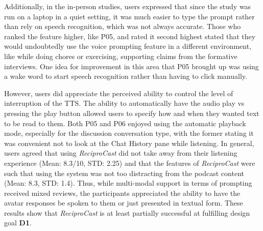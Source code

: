 \documentclass[12pt]{report}
\begin{document}
\begin{myfont}
        \indent Additionally, in the in-person studies, users expressed that since the study was run on a laptop in a quiet setting, it was much easier to type the prompt rather than rely on speech recognition, which was not always accurate. Those who ranked the feature higher, like P05, and rated it second highest stated that they would undoubtedly use the voice prompting feature in a different environment, like while doing chores or exercising, supporting claims from the formative interviews. One idea for improvement in this area that P05 brought up was using a wake word to start speech recognition rather than having to click manually.
        
        \indent However, users did appreciate the perceived ability to control the level of interruption of the TTS. The ability to automatically have the audio play vs pressing the play button allowed users to specify how and when they wanted text to be read to them. Both P05 and P06 enjoyed using the automatic playback mode, especially for the discussion conversation type, with the former stating it was convenient not to look at the Chat History pane while listening. In general, users agreed that using \textit{ReciproCast} did not take away from their listening experience (Mean: 8.3/10, STD: 2.25) and that the features of \textit{ReciproCast} were such that using the system was not too distracting from the podcast content (Mean: 8.3, STD: 1.4). Thus, while multi-modal support in terms of prompting received mixed reviews, the participants appreciated the ability to have the avatar responses be spoken to them or just presented in textual form. These results show that \textit{ReciproCast} is at least partially successful at fulfilling design goal \textbf{D1}.


\end{myfont}
\end{document}
